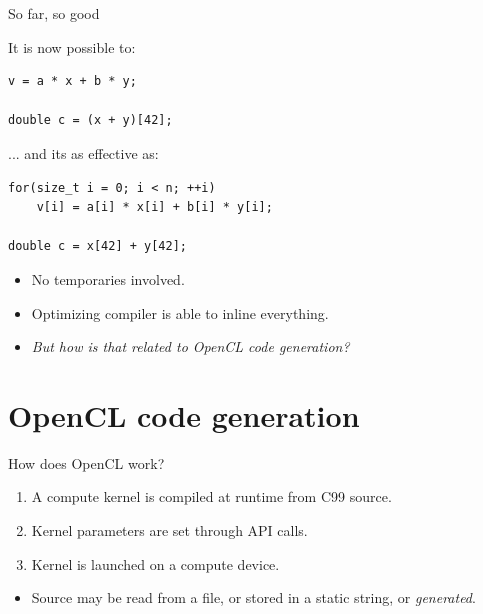 \documentclass[@BEAMER_OPTIONS@]{beamer}
\newcommand{\CC}{{\rm C99}\xspace}
\begin{document}
\begin{frame}[fragile]{So far, so good}
    \begin{exampleblock}{It is now possible to:}
        \begin{lstlisting}
v = a * x + b * y;

double c = (x + y)[42];
        \end{lstlisting}
    \end{exampleblock}

    \begin{exampleblock}{... and its as effective as:}
        \begin{lstlisting}
for(size_t i = 0; i < n; ++i)
    v[i] = a[i] * x[i] + b[i] * y[i];

double c = x[42] + y[42];
        \end{lstlisting}
    \end{exampleblock}
    \begin{itemize}
        \item No temporaries involved.
        \item Optimizing compiler is able to inline everything.
            \vspace{\baselineskip}
            \pause
        \item<alert@2> \emph{But how is that related to OpenCL code generation?}
    \end{itemize}
\end{frame}

\note{ }

\section{OpenCL code generation}
\begin{frame}
    \sectionpage
\end{frame}

\note{ }

\begin{frame}{How does OpenCL work?}
    \begin{enumerate}
        \item A compute kernel is compiled at runtime from \CC source.
        \item Kernel parameters are set through API calls.
        \item Kernel is launched on a compute device.
    \end{enumerate}
    \vspace{\baselineskip}
    \pause
    \begin{itemize}
        \item Source may be read from a file, or stored in a static
            string, or \alert{\emph{generated}}.
    \end{itemize}
\end{frame}
\end{document}
